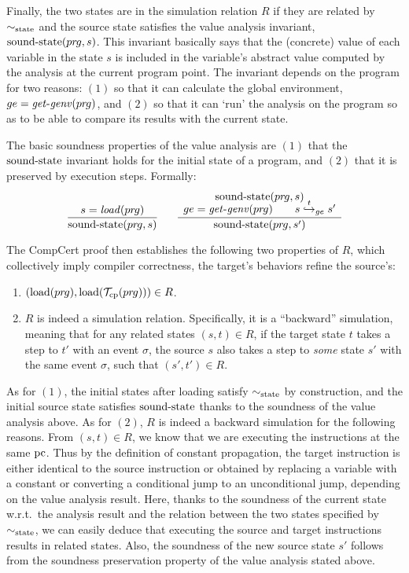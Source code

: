 Finally, the two states are in the simulation relation $R$
if they are related by $\sim_{\mathrm{state}}$ and 
the source state satisfies the value analysis invariant, $\mathrm{sound\text{-}state}({pr\hspace*{-1pt}g},s)$.
This invariant basically says that the (concrete) value of each variable in the state $s$ is included in the variable's abstract value computed by the analysis at the current program point.
The invariant depends on the program for two reasons:
$(1)$ so that it can calculate the global environment, $ge=\mathit{get\text{-}genv}({pr\hspace*{-1pt}g})$, and
$(2)$ so that it can `run' the analysis on the program so as to be able to compare its results with the current state.


The basic soundness properties of the value analysis are
$(1)$ that the $\mathrm{sound\text{-}state}$ invariant holds for the initial state of a program, and
$(2)$ that it is preserved by execution steps.
Formally:
\[
\frac{s = \mathit{load}({pr\hspace*{-1pt}g})}{
  \mathrm{sound\text{-}state}({pr\hspace*{-1pt}g},s)
}
\quad~~
\frac{ 
\begin{array}{c}
  \mathrm{sound\text{-}state}({pr\hspace*{-1pt}g},s) \\[-4pt]
  ge = \mathit{get\text{-}genv}({pr\hspace*{-1pt}g})  \qquad
  s \stackrel{t}{\hookrightarrow}_{ge} s' 
\end{array}
}{
  \mathrm{sound\text{-}state}({pr\hspace*{-1pt}g},s')
}
\]

The CompCert proof then establishes the following two properties of $R$, which collectively imply
compiler correctness, \ie{} the target's behaviors refine the source's:
%
\begin{enumerate}[{(1)}]

\item $(\mathrm{load}({pr\hspace*{-1pt}g}),\mathrm{load}(\mathcal{T}_\mathrm{cp}({pr\hspace*{-1pt}g})))\in R$.

\item $R$ is indeed a simulation relation.  Specifically, it is a ``backward'' simulation, meaning
  that for any related states $(s,t)\in R$, if the target state $t$ takes a step to $t'$ with an
  event $\sigma$, the source $s$ also takes a step to \emph{some} state $s'$ with the same event
  $\sigma$, such that $(s',t') \in R$.

\end{enumerate}
%
\vskip 0.2cm \noindent As for $(1)$, the initial states after loading satisfy $\sim_{\mathrm{state}}$ by
construction, and the initial source state satisfies $\mathrm{sound\text{-}state}$ thanks to the soundness of the
value analysis above.  As for $(2)$, $R$ is indeed a backward simulation for the following reasons.
From $(s,t)\in R$, we know that we are executing the instructions at the same $\mathrm{pc}$. Thus by the
definition of constant propagation, the target instruction is either identical to the source
instruction or obtained by replacing a variable with a constant or converting a conditional jump to
an unconditional jump, depending on the value analysis result.  Here, thanks to the soundness of the
current state w.r.t.\ the analysis result and the relation between the two states specified by
$\sim_{\mathrm{state}}$, we can easily deduce that executing the source and target instructions results in
related states.  Also, the soundness of the new source state $s'$ follows from the soundness
preservation property of the value analysis stated above.

